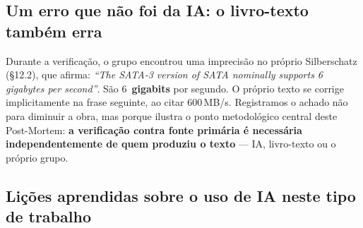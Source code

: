 \documentclass[11pt,a4paper]{article}
\begin{document}
\subsection{Um erro que não foi da IA: o livro-texto também erra}

Durante a verificação, o grupo encontrou uma imprecisão no próprio Silberschatz (§12.2), que
afirma: \emph{``The SATA-3 version of SATA nominally supports 6 gigabytes per second''}. São
6~\textbf{gigabits} por segundo. O próprio texto se corrige implicitamente na frase seguinte,
ao citar 600\,MB/s. Registramos o achado não para diminuir a obra, mas porque ilustra o
ponto metodológico central deste Post-Mortem: \textbf{a verificação contra fonte primária é
necessária independentemente de quem produziu o texto} --- IA, livro-texto ou o próprio
grupo.

\subsection{Lições aprendidas sobre o uso de IA neste tipo de trabalho}
\end{document}
